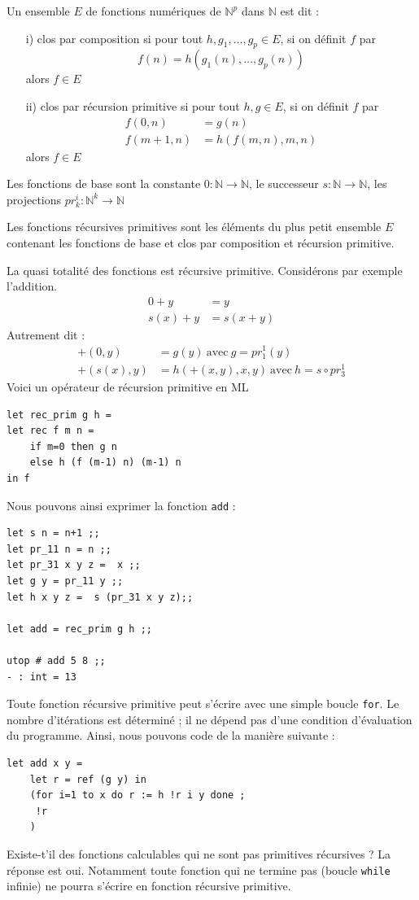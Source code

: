\documentclass[11pt]{book}
\begin{document}
Un ensemble $E$ de fonctions numériques de $\mathbb{N}^p$ dans $\mathbb{N}$ est dit :
\begin{itemize}
	\item [i)] clos par composition si pour tout $h, g_1, \dots,g_p \in E$, si on définit $f$ par
	 $$f(n)=h(g_1(n), \dots, g_p(n))$$
	alors $f \in E$
	\item [ii)] clos par récursion primitive si pour tout $h,g \in E$, si on définit $f$ par
	\begin{align*}
	f(0,n) &= g(n) \\
	f(m+1, n) &= h(f(m,n),m,n)
\end{align*}
alors $f \in E$
\end{itemize}
Les fonctions de base sont la constante $0 : \mathbb{N} \rightarrow \mathbb{N}$, le successeur 
$s :\mathbb{N} \rightarrow \mathbb{N}$, les projections $pr_k^i : \mathbb{N}^k \rightarrow \mathbb{N}$

Les fonctions récursives primitives sont les éléments du plus petit ensemble $E$ contenant les
fonctions de base et clos par composition et récursion primitive.

La quasi totalité des fonctions est récursive primitive. Considérons par exemple l'addition.
\begin{align*}
	0 + y &= y  \\
	s(x) + y &= s(x+y) 
\end{align*}
Autrement dit :
\begin{align*}
	+ (0, y) &=  g(y)\ \text{avec}\ g=pr_1^1 (y) \\
	+ (s(x), y) &= h (+(x, y), x, y)\ \text{avec}\ h=s \circ  pr_3^1
\end{align*}
Voici un opérateur de récursion primitive en ML
\begin{Verbatim}
let rec_prim g h = 
let rec f m n = 
	if m=0 then g n 
	else h (f (m-1) n) (m-1) n
in f 
\end{Verbatim}
Nous pouvons ainsi exprimer la fonction \verb+add+ :
\begin{Verbatim}
let s n = n+1 ;;
let pr_11 n = n ;;
let pr_31 x y z =  x ;;
let g y = pr_11 y ;;
let h x y z =  s (pr_31 x y z);;

let add = rec_prim g h ;;

utop # add 5 8 ;;
- : int = 13
\end{Verbatim}
Toute fonction récursive primitive peut s'écrire avec une simple boucle \verb+for+.
Le nombre d'itérations est déterminé ; il ne dépend pas d'une condition d'évaluation du programme.
Ainsi, nous pouvons code de la manière suivante :
\begin{Verbatim}
let add x y =
	let r = ref (g y) in
	(for i=1 to x do r := h !r i y done ; 
	 !r
	)
\end{Verbatim}
Existe-t'il des fonctions calculables qui ne sont pas primitives récursives ?
La réponse est oui. Notamment toute fonction qui ne termine pas (boucle \verb+while+ infinie)
ne pourra s'écrire en fonction récursive primitive.
\end{document}
